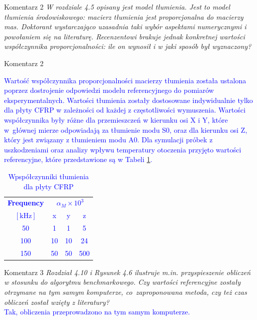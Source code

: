 \documentclass[10pt,aspectratio=169]{beamer} %
\begin{document}
\begin{frame}[label=frame3]{Komentarz 2}\justifying
	\textit{W rozdziale 4.5 opisany jest model tłumienia. Jest to model tłumienia środowiskowego: macierz tłumienia jest proporcjonalna do macierzy mas. Doktorant wystarczająco uzasadnia taki wybór aspektami numerycznymi i powołaniem się na literaturę. Recenzentowi brakuje jednak konkretnej wartości współczynnika proporcjonalności: ile on wynosił i w jaki sposób był wyznaczony?}
\end{frame}
\begin{frame}[label=frame4]{Komentarz 2}\justifying
\textcolor{blue}{Wartość współczynnika proporcjonalności macierzy tłumienia została ustalona poprzez dostrojenie odpowiedzi modelu referencyjnego do pomiarów eksperymentalnych. Wartości tłumienia zostały dostosowane indywidualnie tylko dla płyty CFRP w zależności od każdej z częstotliwości wymuszenia. Wartości współczynnika były różne dla przemieszczeń w kierunku osi X i Y, które w~głównej mierze odpowiadają za tłumienie modu S0, oraz dla kierunku osi Z, który jest związany z tłumieniem modu A0. Dla symulacji próbek z uszkodzeniami oraz analizy wpływu temperatury otoczenia przyjęto wartości referencyjne, które przedstawione są w Tabeli \ref{tab:damp}.
\begin{table}[!hbt]
	\tabcolsep=0.1cm
	\centering
	\caption{\label{tab:damp} Wpspółczynniki tłumienia dla płyty CFRP}
	\begin{tabular}{cccc}
		\textbf{Frequency} & \multicolumn{3}{c}{\(\alpha_M\times 10^3\)} \\
		\([\mathrm{kHz}]\) & x & y & z\\\midrule
		50 & 1 & 1 & 5\\
		100 & 10 & 10 & 24\\
		150 & 50 & 50 & 500
	\end{tabular}
\end{table}
}
\end{frame}	

\begin{frame}[label=frame5]{Komentarz 3}\justifying
\textit{Rozdział 4.10 i Rysunek 4.6 ilustruje m.in. przyspieszenie obliczeń w stosunku do algorytmu benchmarkowego. Czy wartości referencyjne zostały otrzymane na tym samym komputerze, co~zaproponowana metoda, czy też czas obliczeń został wzięty z literatury?}\\
\textcolor{blue}{Tak, obliczenia przeprowadzono na tym samym komputerze.}
\end{frame}
\end{document}
